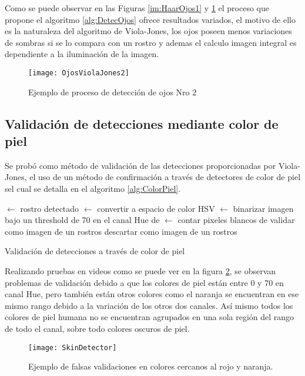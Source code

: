 Como se puede observar en las Figuras \ref{im:HaarOjos1} y \ref{im:HaarOjos2} el proceso que propone el algoritmo \ref{alg:DetecOjos} ofrece resultados variados, el motivo de ello es la naturaleza del algoritmo de Viola-Jones, los ojos poseen menos variaciones de sombras si se lo compara con un rostro y ademas el calculo imagen integral es dependiente a la iluminación de la imagen.

\begin{figure}[h]
	\centering
    \texttt{[image: OjosViolaJones2]}
    \caption{Ejemplo de proceso de detección de ojos Nro 2}
    \label{im:HaarOjos2}
\end{figure}

\subsection{Validación de detecciones mediante color de piel}
Se probó como método de validación de las detecciones proporcionadas por Viola-Jones, el uso de un método de confirmación a través de detectores de color de piel sel cual se detalla en el algoritmo \ref{alg:ColorPiel}.

\begin{algorithm}[h]
\label{alg:ColorPiel}
 $\gets$ rostro detectado\;
 $\gets$ convertir  a espacio de color HSV\;
 $\gets$ binarizar imagen bajo un threshold de 70 en el canal Hue de \;
 $\gets$ contar pixeles blancos de \;
{
	validar  como imagen de un rostros\;
}
{
	descartar  como imagen de un rostros\;
}
\caption{Validación de detecciones a través de color de piel}
\end{algorithm}

Realizando pruebas en videos como se puede ver en la figura \ref{im:skinDetector}, se observan problemas de validación debido a que los colores de piel están entre 0 y 70 en canal Hue, pero también están otros colores como el naranja se encuentran en ese mismo rango debido a la variación de los otros dos canales. Así mismo todos los colores de piel humana no se encuentran agrupados en una sola región del rango de todo el canal, sobre todo colores oscuros de piel.
\begin{figure}[h]
	\centering
    \texttt{[image: SkinDetector]}
    \caption{Ejemplo de falsas validaciones en colores cercanos al rojo y naranja.}
    \label{im:skinDetector}
\end{figure}

